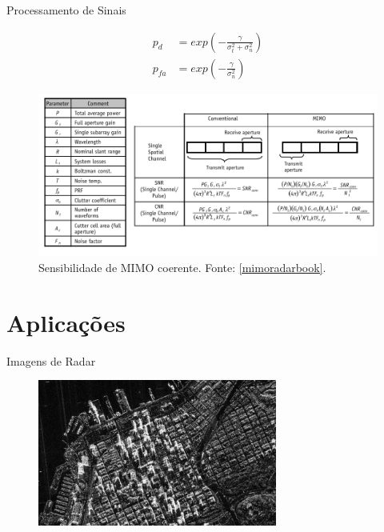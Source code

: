 \documentclass[portuguese]{beamer}
\begin{document}
\begin{frame}{Processamento de Sinais}
  \par
  \small
  \begin{align*}
    p_d &= exp\left( -\frac{\gamma}{\sigma_t^2 + \sigma_n^2} \right)  \\
    p_{fa} &= exp\left( -\frac{\gamma}{\sigma_n^2} \right) 
  \end{align*}
  \begin{figure}[]
	\centering
	\includegraphics[width=0.9\linewidth]{../report/graphics/table.png}
	\caption{Sensibilidade de MIMO coerente. Fonte: \ref{mimoradarbook}.}
	\label{fig:tabela}
  \end{figure}
\end{frame}

\section{Aplicações}

\begin{frame}{Imagens de Radar}
	\begin{figure}[ht]
		\centering
		\includegraphics[width = 0.7\textwidth]{../report/graphics/sandiego.jpg}
		\label{fig:sandiego}
	\end{figure}
\end{frame}
\end{document}
